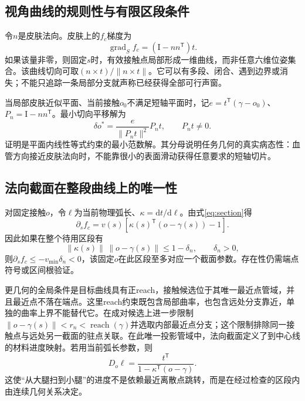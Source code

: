 \documentclass[UTF8,11pt,a4paper,fontset=fandol]{ctexart}
\numberwithin{equation}{section}
\theoremstyle{definition}
\DeclareMathOperator{\reach}{reach}
\newcommand{\dd}{\mathrm d}
\newcommand{\Id}{\mathrm I}
\newcommand{\T}{^{\mathsf T}}
\begin{document}
\subsection{视角曲线的规则性与有限区段条件}
令$n$是皮肤法向。皮肤上的$f_c$梯度为
\begin{equation}
 \operatorname{grad}_{S} f_c=(\Id-nn\T)t.
 \label{eq:skintransverse}
\end{equation}
如果该量非零，则固定$s$时，有效接触点局部形成一维曲线，而非任意六维位姿集合。该曲线切向可取$(n\times t)/\|n\times t\|$。它可以有多段、闭合、遇到边界或消失；不能只追踪一条局部分支就声称已经获得全部可行声窗。

当局部皮肤近似平面、当前接触$o_0$不满足短轴平面时，记$e=t\T(\gamma-o_0)$、$P_n=\Id-nn\T$。最小切向平移解为
\begin{equation}
 \boxed{\delta o^*=\frac{e}{\|P_nt\|^2}P_nt,\qquad P_nt\ne0.}
 \label{eq:minshift}
\end{equation}
证明是平面内线性等式约束的最小范数解。其分母说明任务几何的真实病态性：血管方向接近皮肤法向时，不能靠很小的表面滑动获得任意要求的短轴切片。

\subsection{法向截面在整段曲线上的唯一性}
对固定接触$o$，令$\ell$为当前物理弧长、$\kappa=\dd t/\dd\ell$。由式\eqref{eq:section}得
\begin{equation}
 \boxed{\partial_s f_c=v(s)\left[\kappa(s)\T(o-\gamma(s))-1\right].}
 \label{eq:fs}
\end{equation}
因此如果在整个待用区段有
\begin{equation}
\|\kappa(s)\|\,\|o-\gamma(s)\|\le1-\delta_n,\qquad \delta_n>0,
\end{equation}
则$\partial_sf_c\le-v_{\min}\delta_n<0$，该固定$o$在此区段至多对应一个截面参数。存在性仍需端点符号或区间根验证。

更几何的全局条件是目标曲线具有正reach，接触候选位于其唯一最近点管域，并且最近点不落在端点。这里reach约束既包含局部曲率，也包含远处分支靠近，单独的曲率上界不能替代它\cite{reach2019}。在成对候选上进一步限制$\|o-\gamma(s)\|<r_n<\reach(\gamma)$并选取内部最近点分支；这个限制排除同一接触点与远处另一截面的驻点关联。在此唯一投影管域中，法向截面定义了到中心线的材料进度映射。若用当前弧长参数，则
\begin{equation}
D_o\ell=\frac{t\T}{1-\kappa\T(o-\gamma)}.
\end{equation}
这使“从大腿扫到小腿”的进度不是依赖最近离散点跳转，而是在经过检查的区段内由连续几何关系决定。
\end{document}

